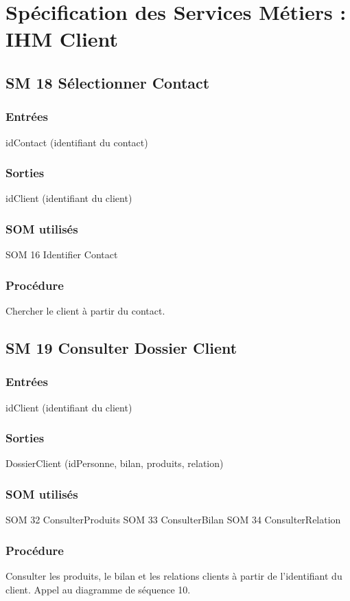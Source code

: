 \section{Spécification des Services Métiers : IHM Client}

\subsection{SM 18 Sélectionner Contact}

\subsubsection{Entrées}
idContact (identifiant du contact)
\subsubsection{Sorties}
idClient (identifiant du client)
\subsubsection{SOM utilisés}
SOM 16 Identifier Contact
\subsubsection{Procédure}
Chercher le client à partir du contact.

\subsection{SM 19 Consulter Dossier Client}

\subsubsection{Entrées}
idClient (identifiant du client)
\subsubsection{Sorties}
DossierClient (idPersonne, bilan, produits, relation)
\subsubsection{SOM utilisés}
SOM 32 ConsulterProduits
SOM 33 ConsulterBilan
SOM 34 ConsulterRelation
\subsubsection{Procédure}
Consulter les produits, le bilan et les relations clients à partir de 
l'identifiant du client.
Appel au diagramme de séquence 10.

